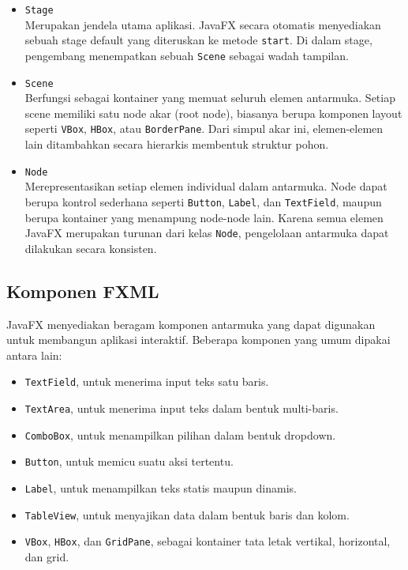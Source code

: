 \begin{itemize}
    \item \texttt{Stage}\\
    Merupakan jendela utama aplikasi. JavaFX secara otomatis menyediakan sebuah stage default yang diteruskan ke metode \texttt{start}. Di dalam stage, pengembang menempatkan sebuah \texttt{Scene} sebagai wadah tampilan.
    
    \item \texttt{Scene}\\
    Berfungsi sebagai kontainer yang memuat seluruh elemen antarmuka. Setiap scene memiliki satu node akar (root node), biasanya berupa komponen layout seperti \texttt{VBox}, \texttt{HBox}, atau \texttt{BorderPane}. Dari simpul akar ini, elemen-elemen lain ditambahkan secara hierarkis membentuk struktur pohon.
    
    \item \texttt{Node}\\
    Merepresentasikan setiap elemen individual dalam antarmuka. Node dapat berupa kontrol sederhana seperti \texttt{Button}, \texttt{Label}, dan \texttt{TextField}, maupun berupa kontainer yang menampung node-node lain. Karena semua elemen JavaFX merupakan turunan dari kelas \texttt{Node}, pengelolaan antarmuka dapat dilakukan secara konsisten.
\end{itemize}

\subsection{Komponen FXML}
JavaFX menyediakan beragam komponen antarmuka yang dapat digunakan untuk membangun aplikasi interaktif. Beberapa komponen yang umum dipakai antara lain:  

\begin{itemize}
    \item \texttt{TextField}, untuk menerima input teks satu baris.
    \item \texttt{TextArea}, untuk menerima input teks dalam bentuk multi-baris.
    \item \texttt{ComboBox}, untuk menampilkan pilihan dalam bentuk dropdown.
    \item \texttt{Button}, untuk memicu suatu aksi tertentu.
    \item \texttt{Label}, untuk menampilkan teks statis maupun dinamis.
    \item \texttt{TableView}, untuk menyajikan data dalam bentuk baris dan kolom.
    \item \texttt{VBox}, \texttt{HBox}, dan \texttt{GridPane}, sebagai kontainer tata letak vertikal, horizontal, dan grid.
\end{itemize}

